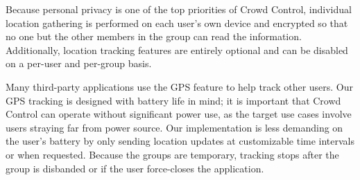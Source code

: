 Because personal privacy is one of the top priorities of Crowd Control, individual location gathering is
performed on each user's own device and encrypted so that no one but the other members in the group
can read the information. Additionally, location tracking features are entirely optional and can be
disabled on a per-user and per-group basis.

Many third-party applications use the GPS feature to help track other users. Our GPS tracking is
designed with battery life in mind; it is important that Crowd Control can operate without significant
power use, as the target use cases involve users straying far from power source. Our implementation
is less demanding on the user's battery by only sending location updates at customizable time intervals
or when requested. Because the groups are temporary, tracking stops after the group is disbanded or if
the user force-closes the application.
